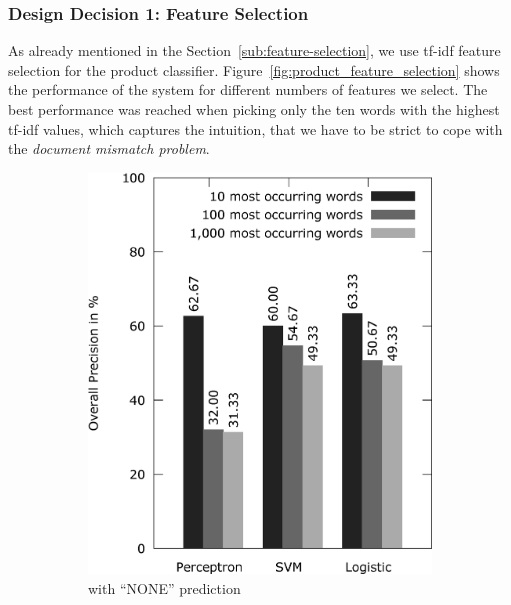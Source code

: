 \subsubsection{Design Decision 1: Feature Selection}
As already mentioned in the Section~\ref{sub:feature-selection}, we use tf-idf feature selection for the product classifier.
Figure~\ref{fig:product_feature_selection} shows the performance of the system for different numbers of features we select.
The best performance was reached when picking only the ten words with the highest tf-idf values, which captures the intuition, that we have to be strict to cope with the \emph{document mismatch problem}.
\begin{figure}[h!]
	\centering
	\begin{subfigure}[t]{0.5\textwidth}
		\includegraphics[width=\textwidth]{figures/product_feature_selection_with_none.eps}
		\caption{with ``NONE'' prediction}
	\end{subfigure}~
	\begin{subfigure}[t]{0.5\textwidth}

\end{subfigure}
\end{figure}
